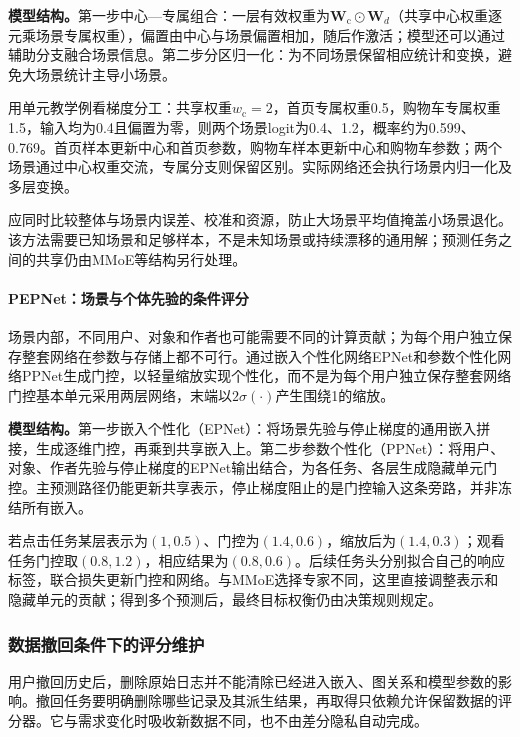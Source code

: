 \textbf{模型结构。}第一步中心—专属组合：一层有效权重为$\bm W_{\mathrm c}\odot\bm W_d$（共享中心权重逐元乘场景专属权重），偏置由中心与场景偏置相加，随后作激活；模型还可以通过辅助分支融合场景信息。第二步分区归一化：为不同场景保留相应统计和变换，避免大场景统计主导小场景。

用单元教学例看梯度分工：共享权重$w_{\mathrm c}=2$，首页专属权重0.5，购物车专属权重1.5，输入均为0.4且偏置为零，则两个场景logit为0.4、1.2，概率约为0.599、0.769。首页样本更新中心和首页参数，购物车样本更新中心和购物车参数；两个场景通过中心权重交流，专属分支则保留区别。实际网络还会执行场景内归一化及多层变换。

应同时比较整体与场景内误差、校准和资源，防止大场景平均值掩盖小场景退化。该方法需要已知场景和足够样本，不是未知场景或持续漂移的通用解；预测任务之间的共享仍由MMoE等结构另行处理。

\paragraph{PEPNet：场景与个体先验的条件评分}
\label{sec:rs-pepnet}

场景内部，不同用户、对象和作者也可能需要不同的计算贡献；为每个用户独立保存整套网络在参数与存储上都不可行。通过嵌入个性化网络EPNet和参数个性化网络PPNet生成门控，以轻量缩放实现个性化，而不是为每个用户独立保存整套网络门控基本单元采用两层网络，末端以$2\sigma(\cdot)$产生围绕1的缩放。

\textbf{模型结构。}第一步嵌入个性化（EPNet）：将场景先验与停止梯度的通用嵌入拼接，生成逐维门控，再乘到共享嵌入上。第二步参数个性化（PPNet）：将用户、对象、作者先验与停止梯度的EPNet输出结合，为各任务、各层生成隐藏单元门控。主预测路径仍能更新共享表示，停止梯度阻止的是门控输入这条旁路，并非冻结所有嵌入。

若点击任务某层表示为$(1,0.5)$、门控为$(1.4,0.6)$，缩放后为$(1.4,0.3)$；观看任务门控取$(0.8,1.2)$，相应结果为$(0.8,0.6)$。后续任务头分别拟合自己的响应标签，联合损失更新门控和网络。与MMoE选择专家不同，这里直接调整表示和隐藏单元的贡献；得到多个预测后，最终目标权衡仍由决策规则规定。

\subsubsection{数据撤回条件下的评分维护}
\label{sec:rs-unlearning-maintenance}

用户撤回历史后，删除原始日志并不能清除已经进入嵌入、图关系和模型参数的影响。撤回任务要明确删除哪些记录及其派生结果，再取得只依赖允许保留数据的评分器。它与需求变化时吸收新数据不同，也不由差分隐私自动完成。

